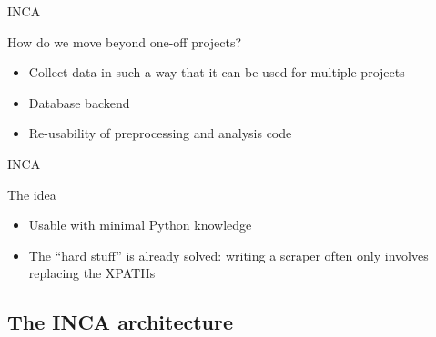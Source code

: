 \documentclass{beamer}
\begin{document}
\begin{frame}{INCA}
\begin{block}{How do we move beyond one-off projects?}
	\begin{itemize}
		\item Collect data in such a way that it can be used for multiple projects
		\item Database backend
		\item Re-usability of preprocessing and analysis code
	\end{itemize}
\end{block}
\end{frame}



\begin{frame}{INCA}
	\begin{block}{The idea}
		\begin{itemize}
		\item Usable with minimal Python knowledge
		\item The ``hard stuff'' is already solved: writing a scraper often only involves replacing the XPATHs
		\end{itemize}
	\end{block}
\end{frame}




\subsection{The INCA architecture}

\begin{frame}[plain]
\end{frame}
\end{document}
